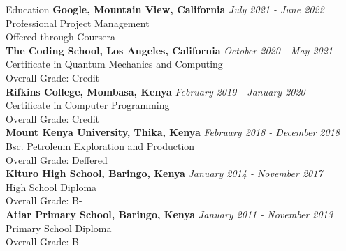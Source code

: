 \documentclass[
	11pt, %
]{resume} %
\begin{document}
\begin{rSection}{Education}
	\textbf{Google, Mountain View, California} \hfill \textit{July 2021 - June 2022} \\ 
	Professional Project Management \\
	Offered through Coursera \\
	\textbf{The Coding School, Los Angeles, California} \hfill \textit{October 2020 - May 2021} \\ 
	Certificate in Quantum Mechanics and Computing \\
	Overall Grade: Credit \\
	\textbf{Rifkins College, Mombasa, Kenya} \hfill \textit{February 2019 - January 2020} \\ 
	Certificate in Computer Programming \\
	Overall Grade: Credit \\
	\textbf{Mount Kenya University, Thika, Kenya} \hfill \textit{February 2018 - December 2018} \\ 
	Bsc. Petroleum Exploration and Production \\
	Overall Grade: Deffered \\
	\textbf{Kituro High School, Baringo, Kenya} \hfill \textit{January 2014 - November 2017} \\ 
	High School Diploma \\
	Overall Grade: B- \\
	\textbf{Atiar Primary School, Baringo, Kenya} \hfill \textit{January 2011 - November 2013} \\ 
	Primary School Diploma \\
	Overall Grade: B-
	
\end{rSection}
\end{document}
